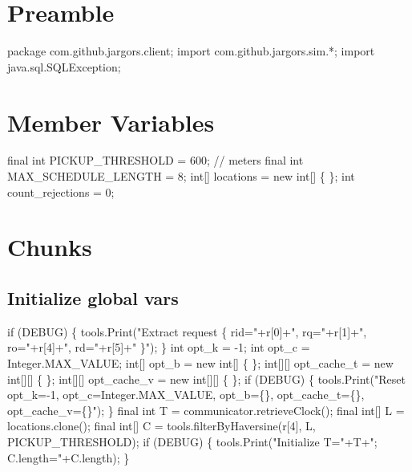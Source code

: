 \section{Preamble}
\nwenddocs{}\endmoddef\nwstartdeflinemarkup{}\nwenddeflinemarkup
package com.github.jargors.client;
import com.github.jargors.sim.*;
import java.sql.SQLException;
\nwendcode{}\nwdocspar

\section{Member Variables}
\nwenddocs{}\endmoddef\nwstartdeflinemarkup{}\nwenddeflinemarkup
final int PICKUP_THRESHOLD = 600;  // meters
final int MAX_SCHEDULE_LENGTH = 8;
int[] locations = new int[] \{ \};
int count_rejections = 0;
\nwendcode{}\nwdocspar

\section{Chunks}

\subsection{Initialize global vars}
\nwenddocs{}\endmoddef\nwstartdeflinemarkup{}\nwenddeflinemarkup
if (DEBUG) \{
  tools.Print("Extract request \{ rid="+r[0]+", rq="+r[1]+", ro="+r[4]+", rd="+r[5]+" \}");
\}
int     opt_k       = -1;
int     opt_c       = Integer.MAX_VALUE;
int[]   opt_b       = new int[] \{ \};
int[][] opt_cache_t = new int[][] \{ \};
int[][] opt_cache_v = new int[][] \{ \};
if (DEBUG) \{
  tools.Print("Reset opt_k=-1, opt_c=Integer.MAX_VALUE, opt_b=\{\}, opt_cache_t=\{\}, opt_cache_v=\{\}");
\}
final int   T = communicator.retrieveClock();
final int[] L = locations.clone();
final int[] C = tools.filterByHaversine(r[4], L, PICKUP_THRESHOLD);
if (DEBUG) \{
  tools.Print("Initialize T="+T+"; C.length="+C.length);
\}
\nwendcode{}\nwdocspar

